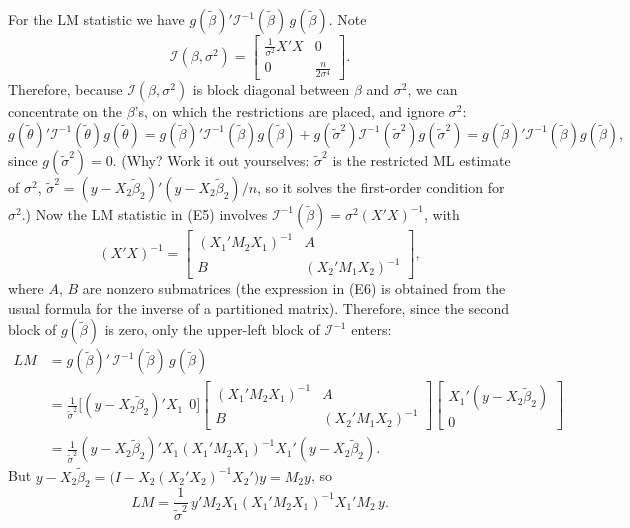 \documentclass[11pt]{article}
\begin{document}
For the LM statistic we have $g(\tilde\beta)'\mathcal I^{-1}(\tilde\beta)\,g(\tilde\beta)$. Note
\begin{equation}\tag{E4}
 \mathcal I(\beta,\sigma^{2})=\begin{bmatrix}\frac1{\sigma^{2}}X'X&0\\0&\frac n{2\sigma^{4}}\end{bmatrix}.
\end{equation}
Therefore, because $\mathcal I(\beta,\sigma^{2})$ is block diagonal between $\beta$ and $\sigma^{2}$, we can
concentrate on the $\beta$'s, on which the restrictions are placed, and ignore $\sigma^{2}$:
\begin{equation}\tag{E5}
 g(\tilde\theta)'\mathcal I^{-1}(\tilde\theta)g(\tilde\theta)
 =g(\tilde\beta)'\mathcal I^{-1}(\tilde\beta)g(\tilde\beta)+g(\tilde\sigma^{2})\mathcal I^{-1}(\tilde\sigma^{2})g(\tilde\sigma^{2})
 =g(\tilde\beta)'\mathcal I^{-1}(\tilde\beta)g(\tilde\beta),
\end{equation}
since $g(\tilde\sigma^{2})=0$. (Why? Work it out yourselves: $\tilde\sigma^{2}$ is the restricted ML
estimate of $\sigma^{2}$, $\tilde\sigma^{2}=(y-X_{2}\tilde\beta_{2})'(y-X_{2}\tilde\beta_{2})/n$, so it solves
the first-order condition for $\sigma^{2}$.) Now the LM statistic in (E5) involves
$\mathcal I^{-1}(\tilde\beta)=\sigma^{2}(X'X)^{-1}$, with
\begin{equation}\tag{E6}
 (X'X)^{-1}=\begin{bmatrix}(X_{1}'M_{2}X_{1})^{-1}&A\\B&(X_{2}'M_{1}X_{2})^{-1}\end{bmatrix},
\end{equation}
where $A$, $B$ are nonzero submatrices (the expression in (E6) is obtained from the usual formula
for the inverse of a partitioned matrix). Therefore, since the second block of $g(\tilde\beta)$ is zero,
only the upper-left block of $\mathcal I^{-1}$ enters:
\begin{align*}
 LM&=g(\tilde\beta)'\,\mathcal I^{-1}(\tilde\beta)\,g(\tilde\beta)\\
   &=\frac1{\tilde\sigma^{2}}\bigl[(y-X_{2}\tilde\beta_{2})'X_{1}\ \ 0\bigr]
     \begin{bmatrix}(X_{1}'M_{2}X_{1})^{-1}&A\\B&(X_{2}'M_{1}X_{2})^{-1}\end{bmatrix}
     \begin{bmatrix}X_{1}'(y-X_{2}\tilde\beta_{2})\\0\end{bmatrix}\\
   &=\frac1{\tilde\sigma^{2}}(y-X_{2}\tilde\beta_{2})'X_{1}(X_{1}'M_{2}X_{1})^{-1}X_{1}'(y-X_{2}\tilde\beta_{2}). \tag{E7}
\end{align*}
But $y-X_{2}\tilde\beta_{2}=\bigl(I-X_{2}(X_{2}'X_{2})^{-1}X_{2}'\bigr)y=M_{2}y$, so
\begin{equation}\tag{E8}
 LM=\frac1{\tilde\sigma^{2}}\,y'M_{2}X_{1}(X_{1}'M_{2}X_{1})^{-1}X_{1}'M_{2}\,y .
\end{equation}
\end{document}
